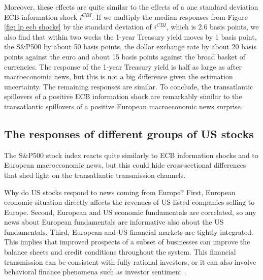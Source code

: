 \documentclass[a4paper,12pt]{article}
\begin{document}
Moreover, these effects are quite similar to the effects of a one standard deviation ECB information shock $i^{CBI}$.
If we multiply the median responses from Figure \ref{fig: lp ecb shocks} by the standard deviation of $i^{CBI}$, which is 2.6 basis points, we also find that
within two weeks the 1-year Treasury yield moves by 1 basis point,
the S\&P500 by about 50 basis points, the dollar exchange rate by about 20 basis points
against the euro and about 15 basis points against the broad basket of currencies.
The response of the 1-year Treasury yield is half as large as after macroeconomic news,
but this is not a big difference given the estimation uncertainty. The remaining responses are similar.
To conclude, the transatlantic spillovers of a positive ECB information shock are remarkably similar to the transatlantic spillovers of a positive European macroeconomic news surprise.

\subsection{The responses of different groups of US stocks}

The S\&P500 stock index reacts quite similarly to ECB information shocks
and to European macroeconomic news, but this could hide cross-sectional differences
that shed light on the transatlantic transmission channels. 

Why do US stocks respond to news coming from Europe?
First, European economic situation directly affects the revenues of US-listed companies
selling to Europe.
Second, European and US economic fundamentals are correlated,
so any news about European fundamentals are informative also about the US fundamentals. 
Third, European and US financial markets are tightly integrated. This implies that improved
prospects of a subset of businesses can improve the balance sheets and credit conditions throughout
the system. This financial transmission can be consistent with fully rational investors,
or it can also involve behavioral finance phenomena such as investor sentiment \citep{Baker_Wurgler_2006}.
\end{document}
